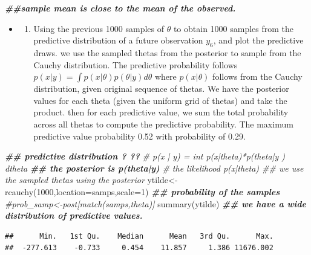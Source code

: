 \documentclass[
]{book}
\newenvironment{Shaded}{\begin{snugshade}}{\end{snugshade}}
\newcommand{\AttributeTok}[1]{\textcolor[rgb]{0.77,0.63,0.00}{#1}}
\newcommand{\CommentTok}[1]{\textcolor[rgb]{0.56,0.35,0.01}{\textit{#1}}}
\newcommand{\DecValTok}[1]{\textcolor[rgb]{0.00,0.00,0.81}{#1}}
\newcommand{\DocumentationTok}[1]{\textcolor[rgb]{0.56,0.35,0.01}{\textbf{\textit{#1}}}}
\newcommand{\FunctionTok}[1]{\textcolor[rgb]{0.00,0.00,0.00}{#1}}
\newcommand{\NormalTok}[1]{#1}
\newcommand{\OtherTok}[1]{\textcolor[rgb]{0.56,0.35,0.01}{#1}}
\providecommand{\tightlist}{%
  \setlength{\itemsep}{0pt}\setlength{\parskip}{0pt}}
\theoremstyle{definition}
\theoremstyle{definition}
\theoremstyle{definition}
\theoremstyle{definition}
\theoremstyle{remark}
\begin{document}
\begin{Shaded}
\begin{Highlighting}[]
  \DocumentationTok{\#\#sample mean is close to the mean of the observed.}
\end{Highlighting}
\end{Shaded}

\begin{itemize}
\item
  \begin{enumerate}
  \def\labelenumi{(\alph{enumi})}
  \setcounter{enumi}{2}
  \tightlist
  \item
    Using the previous 1000 samples of \(\theta\) to obtain 1000 samples from the predictive distribution of a future observation \(y_6\), and plot the predictive draws.
    we use the sampled thetas from the posterior to sample from the Cauchy distribution. The predictive probability follows \(p(x|y) =\int p(x|\theta)p(\theta|y)d\theta\) where \(p(x|\theta)\) follows from the Cauchy distribution, given original sequence of thetas. We have the posterior values for each theta (given the uniform grid of thetas) and take the product. then for each predictive value, we sum the total probability across all thetas to compute the predictive probability. The maximum predictive value probability 0.52 with probability of 0.29.
  \end{enumerate}
\end{itemize}

\begin{Shaded}
\begin{Highlighting}[]
\DocumentationTok{\#\# predictive distribution ? ?? }
 \CommentTok{\# p(x | y) = int p(x|theta)*p(theta|y ) dtheta}
\DocumentationTok{\#\# the posterior is p(theta|y) }
 \CommentTok{\# the likelihood p(x|theta)  \#\# we use the sampled thetas using the posterior}
\NormalTok{ ytilde}\OtherTok{\textless{}{-}}\FunctionTok{rcauchy}\NormalTok{(}\DecValTok{1000}\NormalTok{,}\AttributeTok{location=}\NormalTok{samps,}\AttributeTok{scale=}\DecValTok{1}\NormalTok{) }
 \DocumentationTok{\#\# probability of the samples }
 \CommentTok{\#prob\_samp\textless{}{-}post[match(samps,theta)]}
  \FunctionTok{summary}\NormalTok{(ytilde) }\DocumentationTok{\#\# we have a wide distribution of predictive values.}
\end{Highlighting}
\end{Shaded}

\begin{verbatim}
##      Min.   1st Qu.    Median      Mean   3rd Qu.      Max. 
##  -277.613    -0.733     0.454    11.857     1.386 11676.002
\end{verbatim}
\end{document}
